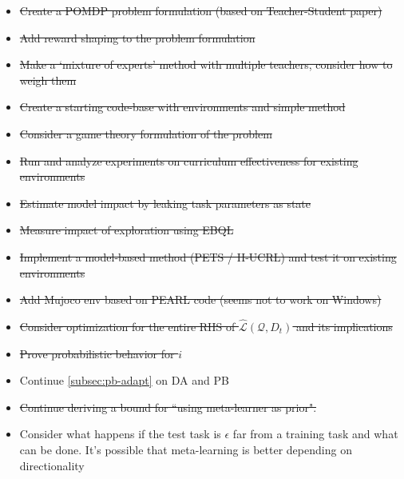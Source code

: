\documentclass[letterpaper]{article}
\theoremstyle{definition}
\begin{document}
\begin{itemize}
	\item \sout{Create a POMDP problem formulation (based on Teacher-Student paper) }
	\item \sout{Add reward shaping to the problem formulation}
	\item \sout{Make a `mixture of experts' method with multiple teachers, consider how to weigh them}
	\item \sout{Create a starting code-base with environments and simple method}
	\item \sout{Consider a game theory formulation of the problem}
	\item \sout{Run and analyze experiments on curriculum effectiveness for existing environments}
	\item \sout{Estimate model impact by leaking task parameters as state}
	\item \sout{Measure impact of exploration using EBQL}
	\item \sout{Implement a model-based method (PETS / H-UCRL) and test it on existing environments}
	\item \sout{Add Mujoco env based on PEARL code (seems not to work on Windows)}
	\item \sout{Consider optimization for the entire RHS of $\hat{\mathcal{L}}(\mathcal{Q}, D_t)$ and its implications}
	\item \sout{Prove probabilistic behavior for $i$}
	\item Continue \ref{subsec:pb-adapt} on DA and PB
	\item \sout{Continue deriving a bound for ``using meta-learner as prior".} 
	\item Consider what happens if the test task is $\epsilon$ far from a training task and what can be done. It's possible that meta-learning is better depending on directionality
\end{itemize}
\end{document}
